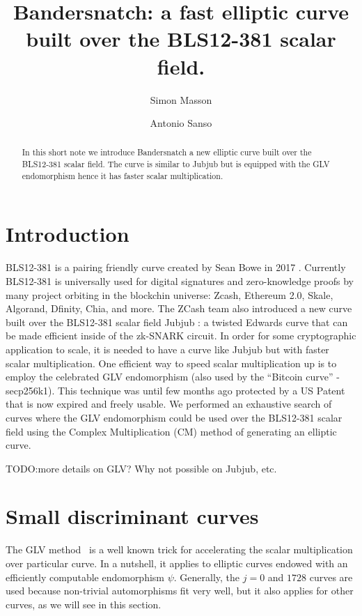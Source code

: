 \documentclass{amsart}
\newcommand{\SM}[1]{\color{blue}#1\color{black}}
\begin{document}
\title[Bandersnatch]{Bandersnatch: a fast elliptic curve built over the BLS12-381 scalar field.}
\author{Simon Masson}
\address{Heliax}
\author{Antonio Sanso}
\address{Ethereum Foundation and Ruhr Universit{\"a}t Bochum}


\maketitle
\medskip
\begin{abstract}
 In this short note we  introduce Bandersnatch a new elliptic curve built over the BLS12-381 \cite{bls12381} scalar field. The curve is similar to Jubjub \cite{jubjub} but is equipped with the GLV endomorphism \cite{C:GalLamVan01} hence it has faster scalar multiplication.
 \end{abstract}

\section{Introduction}
BLS12-381 is a pairing friendly curve created by Sean Bowe in 2017
\cite{bls12381}. Currently BLS12-381 is universally used for digital
signatures and zero-knowledge proofs by many project orbiting in the
blockchin universe: Zcash, Ethereum 2.0, Skale, Algorand, Dfinity,
Chia, and more.
The ZCash team also introduced a new curve built over the BLS12-381
scalar field Jubjub  \cite{jubjub}: a twisted Edwards curve that can
be made efficient inside of the zk-SNARK circuit.
In order for some cryptographic application to scale, it is needed to
have a curve like Jubjub but with faster scalar multiplication. One
efficient way to speed scalar multiplication up is to employ the
celebrated GLV endomorphism \cite{C:GalLamVan01} (also used
by the “Bitcoin curve” - secp256k1).
This technique was until few months ago protected by a US Patent that
is now expired and freely usable.
We performed an exhaustive search of curves where the GLV endomorphism
could be used over the BLS12-381 scalar field using the Complex
Multiplication (CM) method of generating an elliptic curve.

\SM{TODO:more details on GLV? Why not possible on Jubjub, etc.}

\section{Small discriminant curves}

The GLV method~\cite{C:GalLamVan01} is a well known trick for accelerating the
scalar multiplication over particular curve. In a nutshell, it applies
to elliptic curves endowed with an efficiently computable endomorphism
$\psi$.
Generally, the $j=0$ and $1728$ curves are used because non-trivial
automorphisms fit very well, but it also applies for other curves, as
we will see in this section.
\end{document}
